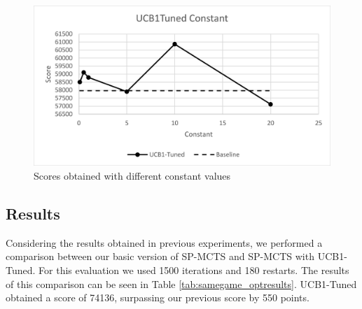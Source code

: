 \begin{figure}[!h]
    \centering
    \includegraphics[width=0.8\linewidth]{pictures/SamegameUCB1Tuned.png}
    \caption[UCB1-Tuned constants scores]{Scores obtained with different constant values}
    \label{fig:samegameucb1tuning}
\end{figure}

\subsection{Results}
Considering the results obtained in previous experiments, we performed a comparison between our basic version of SP-MCTS and SP-MCTS with UCB1-Tuned. For this evaluation we used 1500 iterations and 180 restarts. The results of this comparison can be seen in Table \ref{tab:samegame_optresults}. UCB1-Tuned obtained a score of 74136, surpassing our previous score by 550 points.

